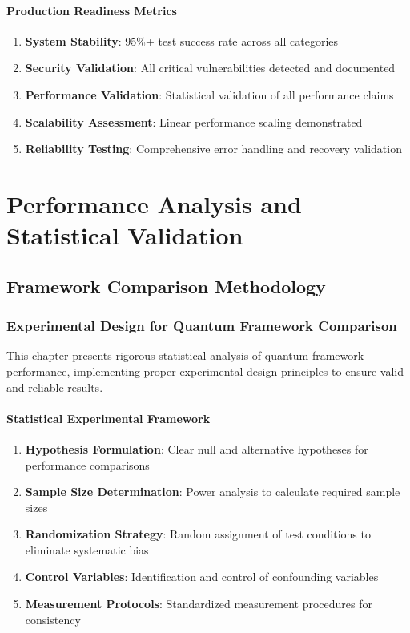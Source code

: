 \documentclass[12pt,a4paper]{report}
\begin{document}
\subsubsection{Production Readiness Metrics}

\begin{enumerate}
\item \textbf{System Stability}: 95\%+ test success rate across all categories
\item \textbf{Security Validation}: All critical vulnerabilities detected and documented
\item \textbf{Performance Validation}: Statistical validation of all performance claims
\item \textbf{Scalability Assessment}: Linear performance scaling demonstrated
\item \textbf{Reliability Testing}: Comprehensive error handling and recovery validation
\end{enumerate}

\chapter{Performance Analysis and Statistical Validation}

\section{Framework Comparison Methodology}

\subsection{Experimental Design for Quantum Framework Comparison}

This chapter presents rigorous statistical analysis of quantum framework performance, implementing proper experimental design principles to ensure valid and reliable results.

\subsubsection{Statistical Experimental Framework}

\begin{enumerate}
\item \textbf{Hypothesis Formulation}: Clear null and alternative hypotheses for performance comparisons
\item \textbf{Sample Size Determination}: Power analysis to calculate required sample sizes
\item \textbf{Randomization Strategy}: Random assignment of test conditions to eliminate systematic bias
\item \textbf{Control Variables}: Identification and control of confounding variables
\item \textbf{Measurement Protocols}: Standardized measurement procedures for consistency
\end{enumerate}
\end{document}
